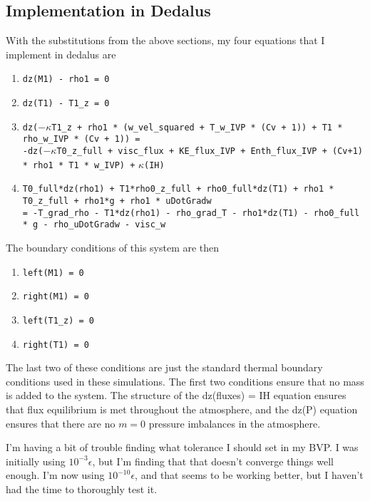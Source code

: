 \documentclass[aps, pre, onecolumn, nofootinbib, notitlepage, groupedaddress, amsfonts, amssymb, amsmath, longbibliography]{revtex4-1}
\begin{document}
\subsection{Implementation in Dedalus}
With the substitutions from the above sections, my four equations that I implement in dedalus are
\begin{enumerate}
\item \texttt{dz(M1) - rho1 = 0}
\item \texttt{dz(T1) - T1\_z = 0}
\item \texttt{dz(}$-\kappa$\texttt{T1\_z + rho1 * (w\_vel\_squared + T\_w\_IVP * (Cv + 1)) + T1 * rho\_w\_IVP * (Cv + 1)) =} \\
	  \texttt{-dz(}$-\kappa$\texttt{T0\_z\_full + visc\_flux + KE\_flux\_IVP + Enth\_flux\_IVP + (Cv+1) * rho1 * T1 * w\_IVP) +} $\kappa$\texttt{(IH)}
\item \texttt{T0\_full*dz(rho1) + T1*rho0\_z\_full + rho0\_full*dz(T1) + rho1 * T0\_z\_full + rho1*g + rho1 * uDotGradw} \\
	  \texttt{= -T\_grad\_rho - T1*dz(rho1) - rho\_grad\_T - rho1*dz(T1) - rho0\_full * g - rho\_uDotGradw - visc\_w }
\end{enumerate}
The boundary conditions of this system are then
\begin{enumerate}
\item \texttt{left(M1) = 0}
\item \texttt{right(M1) = 0}
\item \texttt{left(T1\_z) = 0}
\item \texttt{right(T1) = 0}
\end{enumerate}
The last two of these conditions are just the standard thermal boundary conditions used in these
simulations.  The first two conditions ensure that no mass is added to the system.  The structure of
the dz(fluxes) = IH equation ensures that flux equilibrium is met throughout the atmosphere, and the
dz(P) equation ensures that there are no $m = 0$ pressure imbalances in the atmosphere.

I'm having a bit of trouble finding what tolerance I should set in my BVP.  I was initially using
$10^{-3}\epsilon$, but I'm finding that that doesn't converge things well enough.  I'm now
using $10^{-10}\epsilon$, and that seems to be working better, but I haven't had the
time to thoroughly test it.
\end{document}
